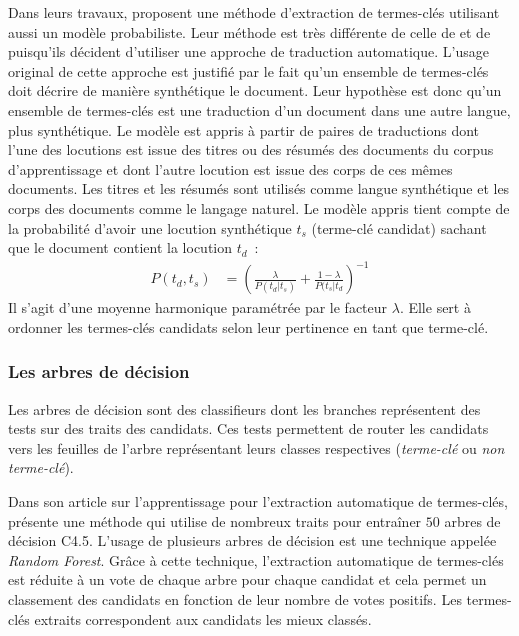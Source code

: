         Dans leurs travaux,  proposent une méthode
        d'extraction de termes-clés utilisant aussi un modèle probabiliste.
        Leur méthode est très différente de celle de  et
        de  puisqu'ils décident d'utiliser une
        approche de traduction automatique. L'usage original de cette approche
        est justifié par le fait qu'un ensemble de termes-clés doit décrire de
        manière synthétique le document. Leur hypothèse est donc qu'un
        ensemble de termes-clés est une traduction d'un document dans une
        autre langue, plus synthétique. Le modèle est appris à partir de
        paires de traductions dont l'une des locutions est issue des titres ou
        des résumés des documents du corpus d'apprentissage et dont l'autre
        locution est issue des corps de ces mêmes documents. Les titres et les
        résumés sont utilisés comme langue synthétique et les corps des
        documents comme le langage naturel. Le modèle appris tient compte de
        la probabilité d'avoir une locution synthétique $t_s$ (terme-clé
        candidat) sachant que le document contient la locution $t_d$~:
          \begin{align}
            P(t_d, t_s) &= \left(\frac{\lambda}{P(t_d | t_s)} + \frac{1 - \lambda}{P(t_s | t_d}\right)^{-1}
          \end{align}
        Il s'agit d'une moyenne harmonique paramétrée par le facteur
        $\lambda$. Elle sert à ordonner les termes-clés candidats selon leur
        pertinence en tant que terme-clé.

      \subsubsection{Les arbres de décision}
      \label{subsubsec:main-state_of_the_art-automatic_keyphrase_extraction-supervised_keyphrase_extraction-decision_trees}
        Les arbres de décision sont des classifieurs dont les branches représentent des tests sur des
        traits des candidats. Ces tests permettent de router les candidats
        vers les feuilles de l'arbre représentant leurs classes respectives
        (\textit{terme-clé} ou \textit{non terme-clé}).

        Dans son article sur l'apprentissage pour l'extraction automatique de
        termes-clés,  présente une méthode
        qui utilise de nombreux traits pour entraîner $50$ arbres de décision
        C4.5. L'usage de plusieurs arbres de décision est une technique
        appelée \textit{Random Forest}. Grâce à cette technique, l'extraction
        automatique de termes-clés est réduite à un vote de chaque arbre pour
        chaque candidat et cela permet un classement des candidats en fonction
        de leur nombre de votes positifs. Les termes-clés extraits
        correspondent aux candidats les mieux classés.

